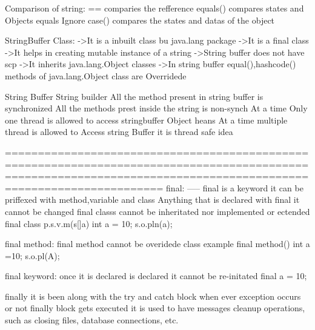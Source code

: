 {Comparison of string:
          ==  comparies the refference
          equals() compares states and Objects
          equals Ignore case()  compares the states and datas of the object


StringBuffer Class:
          ->It is a inbuilt class bu java.lang package
          ->It is a final class
          ->It helps in creating mutable instance of a string
          ->String buffer does not have scp
          ->It inherits java.lang.Object classes
          ->In string buffer equal(),hashcode() methods of java.lang.Object class are Overridede


String Buffer                                                                                                   String builder
All the method present in string buffer is synchronized                                             All the methods prest inside the string is non-synch
At a time Only one thread is allowed to access stringbuffer Object heans                            At a time multiple thread is allowed to Access string Buffer
it is thread safe                                                                                   idea

==================================================================================================================================================================
final:
-----
          final is a keyword
          it can be priffexed with method,variable and class
          Anything that is declared with final it cannot be changed
          final classs cannot be inheritated nor implemented or ectended
          final class{
              p.s.v.m(s[]a){
                 int a = 10;
                 s.o.pln(a);
                 }
          }

          final method:
                    final method cannot be overidede 
                     class example{
                            final method(){
                                int a =10;
                                s.o.pl(A);
                                }
                       }

          final keyword:
                    once it is declared is declared it cannot be re-initated
                    final a = 10;


finally
         it is been along with the try and catch block
         when ever exception occurs or not 
         finally block gets executed 
         it is used to have messages 
         cleanup operations, such as closing files, database connections, etc.

}
